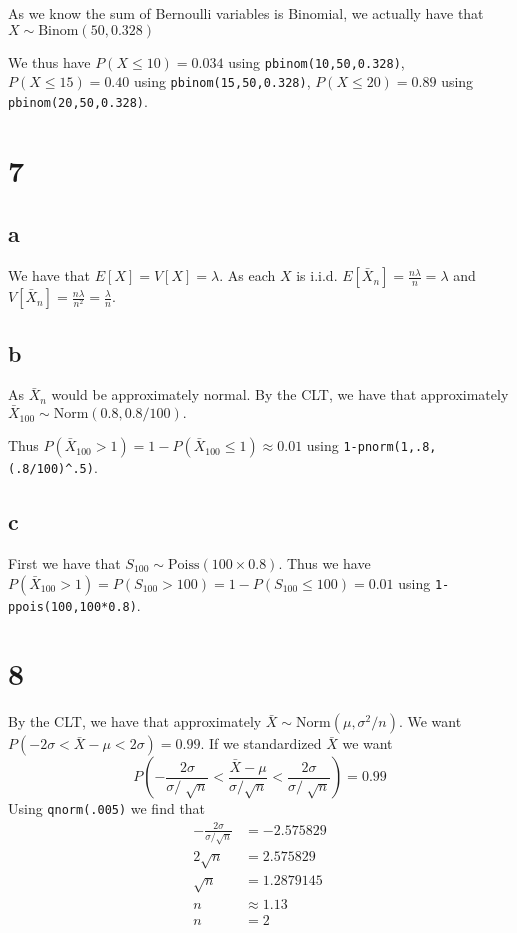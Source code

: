 \documentclass[10pt]{article}
\begin{document}
As we know the sum of Bernoulli variables is Binomial, we actually have that $X\sim\text{Binom}(50,0.328)$

We thus have $P(X\le10)= 0.034$ using \texttt{pbinom(10,50,0.328)},
$P(X\le15)=0.40$ using \texttt{pbinom(15,50,0.328)},
$P(X\le20)=0.89$ using \texttt{pbinom(20,50,0.328)}.

\section*{7}
\subsection*{a}
We have that $E[X]=V[X] = \lambda.$ As each $X$ is i.i.d. $E[\bar{X}_n] = \frac{n\lambda}{n}=\lambda$ and $V[\bar{X}_n]=\frac{n\lambda}{n^2}=\frac{\lambda}{n}.$

\subsection*{b}
As $\bar{X}_n$ would be approximately normal. By the CLT, we have that approximately $\bar{X}_{100}\sim\text{Norm}(0.8,0.8/100).$

Thus $P(\bar{X}_{100}>1)=1-P(\bar{X}_{100}\le1)\approx 0.01$ using \texttt{1-pnorm(1,.8,(.8/100)\textasciicircum.5)}.

\subsection*{c}
First we have that $S_{100}\sim\text{Poiss}(100\times 0.8).$ Thus we have $P(\bar{X}_{100}>1)=P(S_{100}>100)=1-P(S_{100}\le100)=0.01$ using \texttt{1-ppois(100,100*0.8)}.

\section*{8}
By the CLT, we have that approximately $\bar{X}\sim\text{Norm}(\mu, \sigma^2/n).$
We want $P(-2\sigma<\bar{X}-\mu<2\sigma)=0.99.$ If we standardized $\bar{X}$ we want 
\[P(-\frac{2\sigma}{\sigma/\sqrt[]{n}}<\frac{\bar{X}-\mu}{\sigma/\sqrt{n}}<\frac{2\sigma}{\sigma/\sqrt[]{n}})=0.99\]
Using \texttt{qnorm(.005)} we find that
\begin{align*}
    -\frac{2\sigma}{\sigma/\sqrt{n}}&= -2.575829\\
    2\sqrt{n} &= 2.575829\\
    \sqrt{n} &= 1.2879145\\
    n &\approx 1.13\\
    n &= 2
\end{align*}
\end{document}
